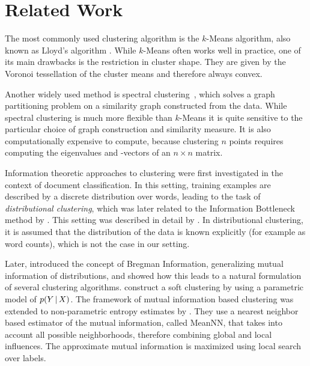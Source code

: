 \section{Related Work}
The most commonly used clustering algorithm is the $k$-Means algorithm, also
known as Lloyd's algorithm \citep{macqueen1967some,lloyd1982least}. While
$k$-Means often works well in practice, one of its main drawbacks is the
restriction in cluster shape. 
%
They are given by the Voronoi tessellation of the cluster means and therefore always convex.

Another widely used method is spectral clustering~\citep{shi2000normalized,ng2002spectral}, 
which solves a graph partitioning problem on a similarity
graph constructed from the data. While spectral clustering is much more
flexible than $k$-Means it is quite sensitive to the particular choice of graph
construction and similarity measure. It is also computationally expensive to
compute, because clustering $n$ points requires computing the eigenvalues and
-vectors of an $n\times n$ matrix.

Information theoretic approaches to clustering were first investigated in the
context of document classification. In this setting, training examples are
described by a discrete distribution over words, leading to the task of
\emph{distributional clustering}, which was later related to the Information
Bottleneck method by \citep{slonim1999agglomerative}.
This setting was described in detail by \citep{dhillon2003divisive}. In
distributional clustering, it is assumed that the distribution of the data is
known explicitly (for example as word counts), which is not the case in our
setting.

Later, \citet{banerjee2005clustering} introduced the concept of Bregman
Information, generalizing mutual information of distributions, and showed how
this leads to a natural formulation of several clustering algorithms.
%
\citet{barber2006kernelized} construct a soft clustering by using a parametric model of $p(Y\, | \, X)$.
%
The framework of mutual information based clustering was extended to
non-parametric entropy estimates by \citet{faivishevsky2010nonparametric}.
They use a nearest neighbor based estimator of the mutual information, called
MeanNN, that takes into account all possible neighborhoods, therefore combining
global and local influences. The approximate mutual information is maximized
using local search over labels.

